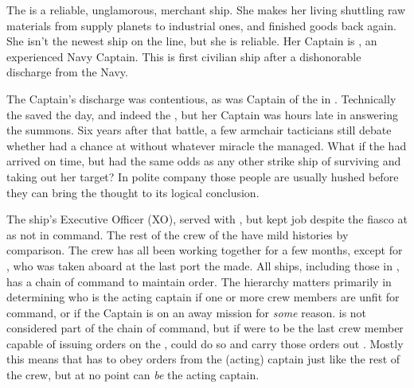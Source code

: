 \documentclass[blue]{TMFHope}
\begin{document}
\name{\bHope{}}

The \pNew{} is a reliable, unglamorous, merchant ship. She makes her living shuttling raw materials from supply planets to industrial ones, and finished goods back again. She isn't the newest ship on the line, but she is reliable. Her Captain is \cCap{}, an experienced Navy Captain. This is \cCap{\their} first civilian ship after a dishonorable discharge from the Navy.  

The Captain's discharge was contentious, as \cCap{} was Captain of the \pOld{} in \pBattle{}. Technically the \pOld{} saved the day, and indeed the \pPlan{}, but her Captain was hours late in answering the summons. Six years after that battle, a few armchair tacticians still debate whether \pPlan{} had a chance at \pHome{} without whatever miracle the \pOld{} managed. What if the \pOld{} had arrived on time, but had the same odds as any other strike ship of surviving and taking out her target? In polite company those people are usually hushed before they can bring the thought to its logical conclusion.

The ship's Executive Officer (XO), \cXO{} served with \cCap{}, but kept \cXO{\their} job despite the fiasco at \pBattle{} as \cXO{\they} \cXO{\were} not in command. The rest of the crew of the \pNew{} have mild histories by comparison. The crew has all been working together for a few months, except for \cBoy{}, who was taken aboard at the last port the \pNew{} made. All ships, including those in \pTMF{}, has a chain of command to maintain order. The hierarchy matters primarily in determining who is the acting captain if one or more crew members are unfit for command, or if the Captain is on an away mission for \emph{some} reason. \cBoy{} is not considered part of the chain of command, but if \cBoy{\they} were to be the last crew member capable of issuing orders on the \pNew{}, \cBoy{\they} could do so and carry those orders out \cBoy{\themself}. Mostly this means that \cBoy{} has to obey orders from the (acting) captain just like the rest of the crew, but at no point can \cBoy{} \emph{be} the acting captain.
\end{document}
